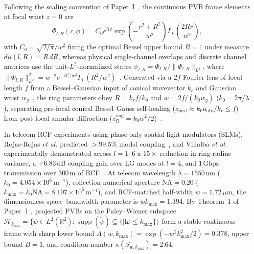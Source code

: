 \documentclass[aps,pra,reprint,nofootinbib,floatfix,longbibliography]{revtex4-2}
\newcommand{\norm}[1]{\lVert #1 \rVert}
\newcommand{\abs}[1]{\lvert #1 \rvert}
\begin{document}
Following the scaling convention of Paper~I~\cite{AyalaPaperI}, the continuous PVB frame elements at focal waist $z = 0$ are
\begin{equation}
\Phi_{l,R}(r,\phi) = C_0 e^{il\phi} \exp\!\left(-\frac{r^2 + R^2}{w^2}\right) I_{\abs{l}}\!\left(\frac{2Rr}{w^2}\right),
\label{eq:pvb_frame_def}
\end{equation}
with $C_0 = \sqrt{2/\pi}/w^2$ fixing the optimal Bessel upper bound $B = 1$ under measure $d\mu(l,R) = R\,dR$, whereas physical single-channel overlaps and discrete channel matrices use the unit-$L^2$-normalized states $\psi_{l,R} = \Phi_{l,R}/\norm{\Phi_{l,R}}_{L^2}$, where $\norm{\Phi_{l,R}}_{L^2}^2 = w^{-2} e^{-R^2/w^2} I_{\abs{l}}(R^2/w^2)$~\cite{Gradshteyn2014}. Generated via a $2f$ Fourier lens of focal length $f$ from a Bessel--Gaussian input of conical wavevector $k_r$ and Gaussian waist $w_g$~\cite{Vaity2015,Gori1987}, the ring parameters obey $R = k_r f/k_0$ and $w = 2f/(k_0 w_g)$ ($k_0 = 2\pi/\lambda$), separating pre-focal conical Bessel--Gauss self-healing ($z_{\mathrm{heal}} \approx k_0 a_{\mathrm{obs}}/k_r \le f$) from post-focal annular diffraction ($z_R^{\mathrm{ring}} = k_0 w^2/2$)~\cite{Reddy2016,AyalaPaperI}.

In telecom RCF experiments using phase-only spatial light modulators (SLMs), Rojas-Rojas \emph{et al.} predicted $>99.5\%$ modal coupling~\cite{RojasRojas2021}, and Villalba \emph{et al.} experimentally demonstrated across $l = 1\text{--}6$ a $15\times$ reduction in ring-radius variance, a $+6.83\,\mathrm{dB}$ coupling gain over $\mathrm{LG}$ modes at $l = 4$, and $1\,\mathrm{Gbps}$ transmission over $300\,\mathrm{m}$ of RCF~\cite{Villalba2023}. At telecom wavelength $\lambda = 1550\,\mathrm{nm}$ ($k_0 = 4.054\times 10^6\,\mathrm{m}^{-1}$), collection numerical aperture $\mathrm{NA} = 0.20$ ($k_{\max} = k_0\mathrm{NA} = 8.107\times 10^5\,\mathrm{m}^{-1}$), and RCF-matched half-width $w = 1.72\,\mu\mathrm{m}$, the dimensionless space--bandwidth parameter is $w k_{\max} = 1.394$. By Theorem~1 of Paper~I~\cite{AyalaPaperI}, projected PVBs on the Paley--Wiener subspace $\mathcal{H}_{k_{\max}} = \{\psi \in L^2(\mathbb{R}^2) : \operatorname{supp}(\widetilde{\psi}) \subseteq \{\abs{\mathbf{k}} \le k_{\max}\}\}$ form a stable continuous frame with sharp lower bound $A(w,k_{\max}) = \exp(-w^2 k_{\max}^2/2) = 0.378$, upper bound $B = 1$, and condition number $\kappa(S_{w,k_{\max}}) = 2.64$.
\end{document}
